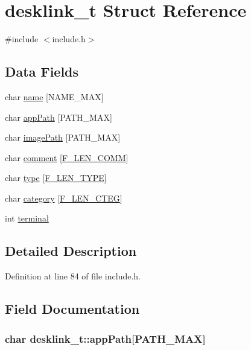 \hypertarget{structdesklink__t}{\section{desklink\-\_\-t Struct Reference}
\label{structdesklink__t}
}


{\ttfamily \#include $<$include.\-h$>$}

\subsection*{Data Fields}
\begin{DoxyCompactItemize}
\item 
char \hyperlink{structdesklink__t_aff78ef2e29eaf6152f7586605dff6feb}{name} \mbox{[}N\-A\-M\-E\-\_\-\-M\-A\-X\mbox{]}
\item 
char \hyperlink{structdesklink__t_aaf17b18d943c7240fca22ce5083334d8}{app\-Path} \mbox{[}P\-A\-T\-H\-\_\-\-M\-A\-X\mbox{]}
\item 
char \hyperlink{structdesklink__t_ab0de75054dd03a6b44b273ebd1323ae8}{image\-Path} \mbox{[}P\-A\-T\-H\-\_\-\-M\-A\-X\mbox{]}
\item 
char \hyperlink{structdesklink__t_a0efc59f36ee30fbd57b45311fa2b419b}{comment} \mbox{[}\hyperlink{include_8h_a9c0aa1f4715bb32583eadc59c3dabe50}{F\-\_\-\-L\-E\-N\-\_\-\-C\-O\-M\-M}\mbox{]}
\item 
char \hyperlink{structdesklink__t_a79948cb813d8297cb011b9f9bd8a2ae4}{type} \mbox{[}\hyperlink{include_8h_a4d27e2aaf15863cdc020a72264660e3f}{F\-\_\-\-L\-E\-N\-\_\-\-T\-Y\-P\-E}\mbox{]}
\item 
char \hyperlink{structdesklink__t_add249bcfddfb8faa30cab3c6a7977883}{category} \mbox{[}\hyperlink{include_8h_ac2bfdb8881c8ce56b7d6d779007c9e89}{F\-\_\-\-L\-E\-N\-\_\-\-C\-T\-E\-G}\mbox{]}
\item 
int \hyperlink{structdesklink__t_a33ccf506137c32d9f2404beb6e913412}{terminal}
\end{DoxyCompactItemize}


\subsection{Detailed Description}


Definition at line 84 of file include.\-h.



\subsection{Field Documentation}
\hypertarget{structdesklink__t_aaf17b18d943c7240fca22ce5083334d8}{
\subsubsection[{app\-Path}]{\setlength{\rightskip}{0pt plus 5cm}char desklink\-\_\-t\-::app\-Path\mbox{[}P\-A\-T\-H\-\_\-\-M\-A\-X\mbox{]}}}\label{structdesklink__t_aaf17b18d943c7240fca22ce5083334d8}


